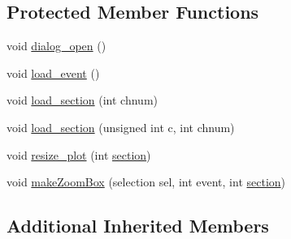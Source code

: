 \subsection*{Protected Member Functions}
\begin{DoxyCompactItemize}
\item 
void \hyperlink{classtds__display_abaaece4e03cb3b0562a57c05bd7e8ef9}{dialog\-\_\-open} ()
\item 
void \hyperlink{classtds__display_ad2289a5a1c2614afbdf9da4fbeea897d}{load\-\_\-event} ()
\item 
void \hyperlink{classtds__display_a6b308b8c7e8b801f07007996e4af2bce}{load\-\_\-section} (int chnum)
\item 
void \hyperlink{classtds__display_a7c7c21140b244d8e3dbfb78aac79e8bc}{load\-\_\-section} (unsigned int c, int chnum)
\item 
void \hyperlink{classtds__display_aad8f138a9fdf0e2e29f70809bd476297}{resize\-\_\-plot} (int \hyperlink{classtds_a09ac79f6931aaf6af64feaca4f167409}{section})
\item 
void \hyperlink{classtds__display_a19c73c213a30b8c1e49f53975fe30341}{make\-Zoom\-Box} (selection sel, int event, int \hyperlink{classtds_a09ac79f6931aaf6af64feaca4f167409}{section})
\end{DoxyCompactItemize}
\subsection*{Additional Inherited Members}


